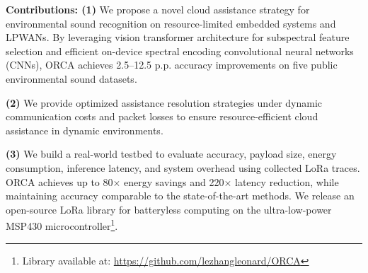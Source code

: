 \noindent
\textbf{Contributions: (1)} We propose a novel cloud assistance strategy for environmental sound recognition on resource-limited embedded systems and LPWANs. By leveraging vision transformer architecture for subspectral feature selection and efficient on-device spectral encoding convolutional neural networks (CNNs), ORCA achieves 2.5–12.5 p.p. accuracy improvements on five public environmental sound datasets.

\noindent
\textbf{(2)} We provide optimized assistance resolution strategies under dynamic communication costs and packet losses to ensure resource-efficient cloud assistance in dynamic environments.

\noindent
\textbf{(3)} We build a real-world testbed to evaluate accuracy, payload size, energy consumption, inference latency, and system overhead using collected LoRa traces. ORCA achieves up to 80$\times$ energy savings and 220$\times$ latency reduction, while maintaining accuracy comparable to the state-of-the-art methods. We release an open-source LoRa library for batteryless computing on the ultra-low-power MSP430 microcontroller\footnote{Library available at: \url{https://github.com/lezhangleonard/ORCA}}.







